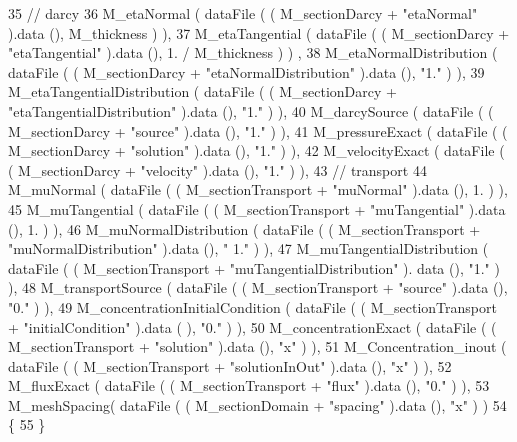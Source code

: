 \begin{DoxyCode}
35             \textcolor{comment}{// darcy}
36             M\_etaNormal ( dataFile ( ( M\_sectionDarcy + \textcolor{stringliteral}{"etaNormal"} ).data (), M\_thickness ) ),
37             M\_etaTangential ( dataFile ( ( M\_sectionDarcy + \textcolor{stringliteral}{"etaTangential"} ).data (), 1. / M\_thickness ) )
      ,
38             M\_etaNormalDistribution ( dataFile ( ( M\_sectionDarcy + \textcolor{stringliteral}{"etaNormalDistribution"} ).data (), \textcolor{stringliteral}{"1."}
       ) ),
39             M\_etaTangentialDistribution ( dataFile ( ( M\_sectionDarcy + \textcolor{stringliteral}{"etaTangentialDistribution"} ).data 
      (), \textcolor{stringliteral}{"1."} ) ),
40             M\_darcySource ( dataFile ( ( M\_sectionDarcy + \textcolor{stringliteral}{"source"} ).data (), \textcolor{stringliteral}{"1."} ) ),
41             M\_pressureExact ( dataFile ( ( M\_sectionDarcy + \textcolor{stringliteral}{"solution"} ).data (), \textcolor{stringliteral}{"1."} ) ),
42             M\_velocityExact ( dataFile ( ( M\_sectionDarcy + \textcolor{stringliteral}{"velocity"} ).data (), \textcolor{stringliteral}{"1."} ) ),
43             \textcolor{comment}{// transport}
44             M\_muNormal ( dataFile ( ( M\_sectionTransport + \textcolor{stringliteral}{"muNormal"} ).data (), 1. ) ),
45             M\_muTangential ( dataFile ( ( M\_sectionTransport + \textcolor{stringliteral}{"muTangential"} ).data (), 1. ) ),
46             M\_muNormalDistribution ( dataFile ( ( M\_sectionTransport + \textcolor{stringliteral}{"muNormalDistribution"} ).data (), \textcolor{stringliteral}{"
      1."} ) ),
47             M\_muTangentialDistribution ( dataFile ( ( M\_sectionTransport + \textcolor{stringliteral}{"muTangentialDistribution"} ).
      data (), \textcolor{stringliteral}{"1."} ) ),
48             M\_transportSource ( dataFile ( ( M\_sectionTransport + \textcolor{stringliteral}{"source"} ).data (), \textcolor{stringliteral}{"0."} ) ),
49             M\_concentrationInitialCondition ( dataFile ( ( M\_sectionTransport + \textcolor{stringliteral}{"initialCondition"} ).data (
      ), \textcolor{stringliteral}{"0."} ) ),
50             M\_concentrationExact ( dataFile ( ( M\_sectionTransport + \textcolor{stringliteral}{"solution"} ).data (), \textcolor{stringliteral}{"x"} ) ),
51             M\_Concentration\_inout ( dataFile ( ( M\_sectionTransport + \textcolor{stringliteral}{"solutionInOut"} ).data (), \textcolor{stringliteral}{"x"} ) ),
52             M\_fluxExact ( dataFile ( ( M\_sectionTransport + \textcolor{stringliteral}{"flux"} ).data (), \textcolor{stringliteral}{"0."} ) ),
53             M\_meshSpacing( dataFile ( ( M\_sectionDomain + \textcolor{stringliteral}{"spacing"} ).data (), \textcolor{stringliteral}{"x"} ) )
54 \{
55 \}
\end{DoxyCode}



